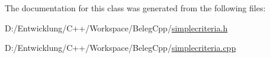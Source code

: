 The documentation for this class was generated from the following files\+:\begin{DoxyCompactItemize}
\item 
D\+:/\+Entwicklung/\+C++/\+Workspace/\+Beleg\+Cpp/\hyperlink{simplecriteria_8h}{simplecriteria.\+h}\item 
D\+:/\+Entwicklung/\+C++/\+Workspace/\+Beleg\+Cpp/\hyperlink{simplecriteria_8cpp}{simplecriteria.\+cpp}\end{DoxyCompactItemize}
